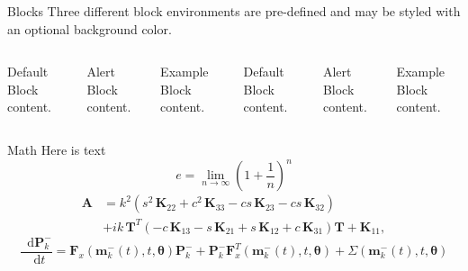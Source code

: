 \documentclass[10pt,aspectratio=169]{beamer} %
\newcommand{\matr}[1]{\mathbf{#1}} %
\newcommand{\vect}[1]{\mathbf{#1}} %
\DeclareRobustCommand*{\drv}{\mathop{}\!\mathrm{d}}
\begin{document}
\begin{frame}{Blocks}
  Three different block environments are pre-defined and may be styled with an
  optional background color.

  \begin{columns}[T,onlytextwidth]
      \begin{block}{Default}
        Block content.
      \end{block}

      \begin{alertblock}{Alert}
        Block content.
      \end{alertblock}

      \begin{exampleblock}{Example}
        Block content.
      \end{exampleblock}



      \begin{block}{Default}
        Block content.
      \end{block}

      \begin{alertblock}{Alert}
        Block content.
      \end{alertblock}

      \begin{exampleblock}{Example}
        Block content.
      \end{exampleblock}

  \end{columns}
\end{frame}
\begin{frame}{Math}
Here is text \cite{knuth92}
  \begin{equation*}
    e = \lim_{n\to \infty} \left(1 + \frac{1}{n}\right)^n
  \end{equation*}
  \begin{equation*}
 	 \begin{aligned}
  		\matr{A} & =  k^2\left(s^2 \,\matr{K}_{22} + c^2\, \matr{K}_{33} - c s\, \matr{K}_{23} - c s\, \matr{K}_{32}\right) \\
  		& + i k\, \matr{T}^T\left(-c\, \matr{K}_{13} - s\, \matr{K}_{21} + s\, \matr{K}_{12} + c\, \matr{K}_{31}\right) \matr{T} +\matr{K}_{11},
  	\end{aligned}
  \end{equation*}
 \begin{equation}
  \frac{\drv\vect{P}_k^-}{\drv t}=\vect{F}_x(\vect{m}_k^-(t),t,\vect{\theta})\vect{P}_k^- +\vect{P}_k^- \vect{F}_x^T(\vect{m}_k^-(t),t,\vect{\theta}) + \Sigma(\vect{m}_k^-(t),t,\vect{\theta})
 \label{eq:Euler}
\end{equation}
\end{frame}
\end{document}
